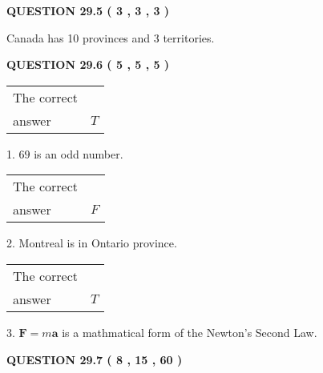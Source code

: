 \documentclass[12pt]{article}
\begin{document}
{\textbf{\Large{QUESTION
29.5 
 (           3 ,           3 ,           3 )
}}}
  
  
 
 
\noindent{}
 
 
Canada has  %
10 provinces and  %
3 territories.
 
 
 
 
  
\vspace{0.2in}
  
{\textbf{\Large{QUESTION
29.6 
 (           5 ,           5 ,           5 )
}}}
  
  
 
 
\noindent{}

 
\noindent\begin{tabular}{|l|l|}\hline The correct & \\
          answer &  %
$T$ \\ \hline \end{tabular}
1. $ %
69$ is an  %
odd number.
 
\noindent\begin{tabular}{|l|l|}\hline The correct & \\
          answer &  %
$F$ \\ \hline \end{tabular}
2.  %
Montreal is in  %
Ontario province.
 
\noindent\begin{tabular}{|l|l|}\hline The correct & \\
          answer &  %
$T$ \\ \hline \end{tabular}
3.  %
$\mathbf{F}=m\mathbf{a}$ is a mathmatical form of  %
the Newton's Second Law.
 
 
 
  
\vspace{0.2in}
  
{\textbf{\Large{QUESTION
29.7 
 (           8 ,          15 ,          60 )
}}}
  
  
 
 
\noindent{}
\end{document}
